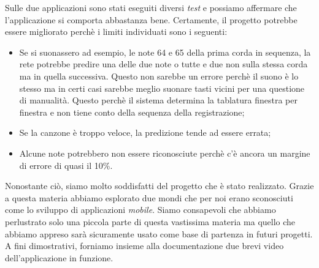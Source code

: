 Sulle due applicazioni sono stati eseguiti diversi \textit{test} e possiamo affermare che l'applicazione si comporta abbastanza bene. Certamente, il progetto potrebbe essere migliorato perchè i limiti individuati sono i seguenti:
\begin{itemize}
		\item Se si suonassero ad esempio, le note 64 e 65 della prima corda in sequenza, la rete potrebbe predire una delle due note o tutte e due non sulla stessa corda ma in quella successiva. Questo non sarebbe un errore perchè il suono è lo stesso ma in certi casi sarebbe meglio suonare tasti vicini per una questione di manualità. Questo perchè il sistema determina la tablatura finestra per finestra e non tiene conto della sequenza della registrazione;
		\item Se la canzone è troppo veloce, la predizione tende ad essere errata;
		\item Alcune note potrebbero non essere riconosciute perchè c'è ancora un margine di errore di quasi il 10\%.
	\end{itemize}
Nonostante ciò, siamo molto soddisfatti del progetto che è stato realizzato. Grazie a questa materia abbiamo esplorato due mondi che per noi erano sconosciuti come lo sviluppo di applicazioni \textit{mobile}. Siamo consapevoli che abbiamo perlustrato solo una piccola parte di questa vastissima materia ma quello che abbiamo appreso sarà sicuramente usato come base di partenza in futuri progetti.\\
\newline
A fini dimostrativi, forniamo insieme alla documentazione due brevi video dell'applicazione in funzione.